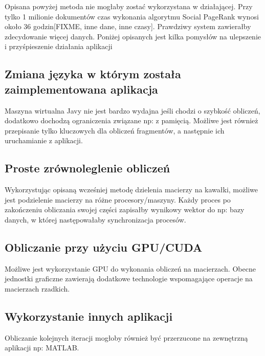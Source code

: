 Opisana powyżej metoda nie mogłaby zostać wykorzystana w działającej. Przy tylko 1 milionie dokumentów czas wykonania algorytmu Social PageRank wynosi około 36 godzin[FIXME, inne dane, inne czasy]. Prawdziwy system zawierałby zdecydowanie więcej danych. Poniżej opisanych jest kilka  pomysłów na ulepszenie i przyśpieszenie działania aplikacji

\subsection*{Zmiana języka w którym została zaimplementowana aplikacja}
Maszyna wirtualna Javy nie jest bardzo wydajna jeśli chodzi o szybkość obliczeń, dodatkowo dochodzą ograniczenia związane np: z pamięcią. Możliwe jest również przepisanie tylko kluczowych dla obliczeń fragmentów, a następnie ich uruchamianie z aplikacji. 

\subsection*{Proste zrównoleglenie obliczeń}
Wykorzystując opisaną wcześniej metodę dzielenia macierzy na kawałki, możliwe jest podzielenie macierzy na różne procesory/maszyny. Każdy proces po zakończeniu obliczania swojej części zapisałby wynikowy wektor do np: bazy danych, w której następowałaby synchronizacja procesów. 

\subsection*{Obliczanie przy użyciu GPU/CUDA} 

Możliwe jest wykorzystanie GPU do wykonania obliczeń na macierzach. Obecne jednostki graficzne zawierają dodatkowe technologie wspomagające operacje na macierzach rzadkich. 

\subsection*{Wykorzystanie innych aplikacji}

Obliczanie kolejnych iteracji mogłoby również być przerzucone na zewnętrzną aplikacji np: MATLAB.




